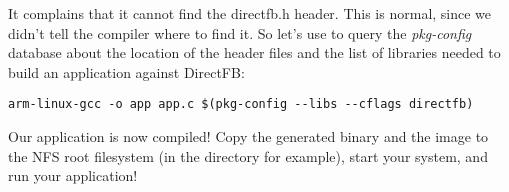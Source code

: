 It complains that it cannot find the directfb.h header. This is
normal, since we didn't tell the compiler where to find it. So let's
use  to query the {\em pkg-config} database about the
location of the header files and the list of libraries needed to build
an application against DirectFB:

\footnotesize
\begin{verbatim}
arm-linux-gcc -o app app.c $(pkg-config --libs --cflags directfb)
\end{verbatim}
\normalsize

Our application is now compiled! Copy the generated binary and the
 image to the NFS root filesystem (in the
 directory for example), start your system, and run your
application!
